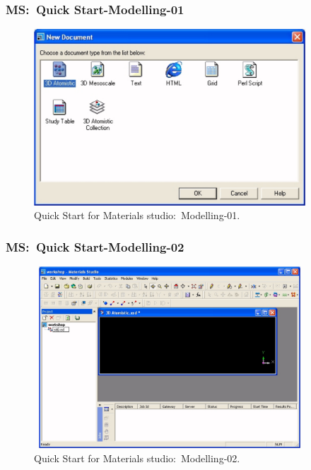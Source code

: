 \frame
{
	\frametitle{\textrm{MS:~Quick Start-Modelling-01}}
\begin{figure}[h!]
\centering
\vspace*{-0.10in}
\includegraphics[height=2.60in,width=4.00in,viewport=0 0 1090 710,clip]{Figures/MS-New_Project-04.png}
\caption{\tiny \textrm{Quick Start for Materials studio:~Modelling-01.}}%
\label{MS-Quick_Start-Modelling-01}
\end{figure}
}

\frame
{
	\frametitle{\textrm{MS:~Quick Start-Modelling-02}}
\begin{figure}[h!]
\centering
\vspace*{-0.10in}
\includegraphics[height=2.68in,width=4.00in,viewport=0 0 1090 760,clip]{Figures/MS-New_Project-05.png}
\caption{\tiny \textrm{Quick Start for Materials studio:~Modelling-02.}}%
\label{MS-Quick_Start-Modelling-02}
\end{figure}
}

